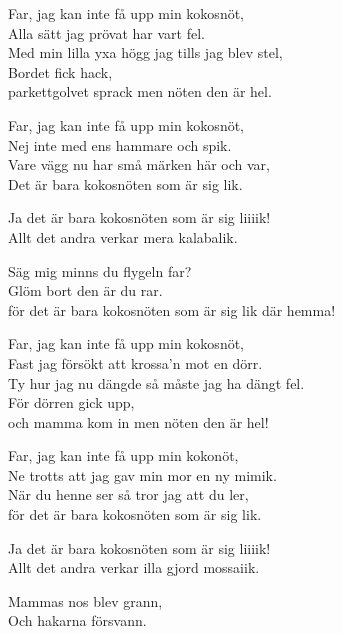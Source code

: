 \vspace{10pt}
Far, jag kan inte få upp min kokosnöt,\\
Alla sätt jag prövat har vart fel.\\
Med min lilla yxa högg jag tills jag blev stel,\\
Bordet fick hack,\\
parkettgolvet sprack men nöten den är hel.\par
\vspace{10pt}
Far, jag kan inte få upp min kokosnöt,\\
Nej inte med ens hammare och spik.\\
Vare vägg nu har små märken här och var,\\
Det är bara kokosnöten som är sig lik.\par
\vspace{10pt}
Ja det är bara kokosnöten som är sig liiiik!\\
Allt det andra verkar mera kalabalik.\par
\vspace{10pt}
Säg mig minns du flygeln far?\\
Glöm bort den är du rar.\\
för det är bara kokosnöten som är sig lik där hemma!\par
\vspace{10pt}
Far, jag kan inte få upp min kokosnöt,\\
Fast jag försökt att krossa'n mot en dörr.\\
Ty hur jag nu dängde så måste jag ha dängt fel.\\
För dörren gick upp,\\
och mamma kom in men nöten den är hel!\par
\vspace{10pt}
Far, jag kan inte få upp min kokonöt,\\
Ne trotts att jag gav min mor en ny mimik.\\
När du henne ser så tror jag att du ler,\\
för det är bara kokosnöten som är sig lik.\par
\vspace{10pt}
Ja det är bara kokosnöten som är sig liiiik!\\
Allt det andra verkar illa gjord mossaiik.\par
\vspace{10pt}
Mammas nos blev grann,\\
Och hakarna försvann.\\
